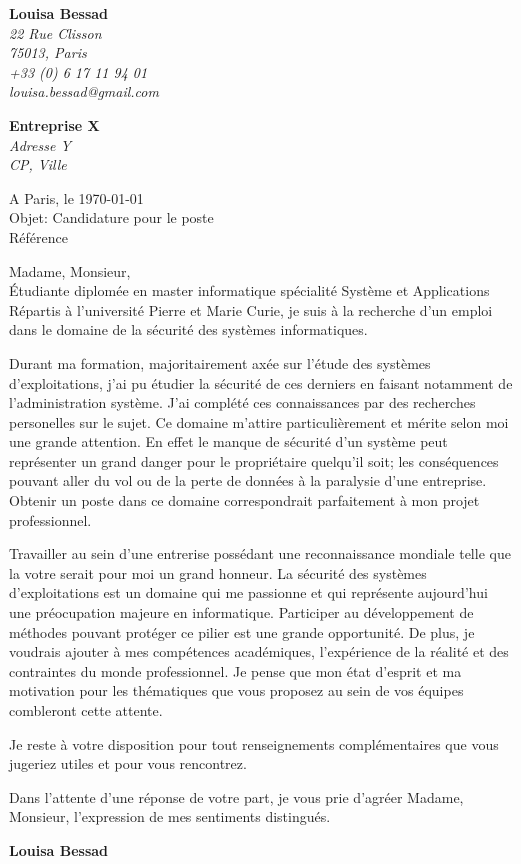 \documentclass[12pt]{letter}
\begin{document}
 \sffamily
 \begin{flushleft}
 {\bfseries Louisa Bessad}\\[.35ex]
 \small\itshape
 22 Rue Clisson\\
 75013, Paris\\[.35ex]
 +33 (0) 6 17 11 94 01\\
 louisa.bessad@gmail.com
 \end{flushleft}
 \begin{flushright}
 {\bfseries Entreprise X}\\[.35ex]
 \small\itshape
 Adresse Y\\
 CP, Ville
 \end{flushright}
 \begin{flushright}
 A Paris, le \today \\
 Objet: Candidature pour le poste \\
 Référence
 \end{flushright}
 Madame, Monsieur,\\


Étudiante diplomée en master informatique spécialité Système et Applications Répartis à l'université Pierre et Marie Curie, je suis à la recherche d'un emploi dans le domaine de la sécurité des systèmes informatiques.

Durant ma formation, majoritairement axée sur l'étude des systèmes d'exploitations, j'ai pu étudier la sécurité de ces derniers en faisant notamment de l'administration système. J'ai complété ces connaissances par des recherches personelles sur le sujet. Ce domaine m'attire particulièrement et mérite selon moi une grande attention. En effet le manque de sécurité d'un système peut représenter un grand danger pour le propriétaire quelqu'il soit; les conséquences pouvant aller du vol ou de la perte de données à la paralysie d'une entreprise. Obtenir un poste dans ce domaine correspondrait parfaitement à mon projet professionnel.

Travailler au sein d'une entrerise possédant une reconnaissance mondiale telle que la votre serait pour moi un grand honneur. La sécurité des systèmes d'exploitations est un domaine qui me passionne et qui représente aujourd'hui une préocupation majeure en informatique. Participer au développement de méthodes pouvant protéger ce pilier est une grande opportunité. De plus, je voudrais ajouter à mes compétences académiques, l'expérience de la réalité et des contraintes du monde professionnel. Je pense que mon état d'esprit et ma motivation pour les thématiques que vous proposez au sein de vos équipes combleront cette attente.

Je reste à votre disposition pour tout renseignements complémentaires que vous jugeriez utiles et pour vous rencontrez.

Dans l'attente d'une réponse de votre part, je vous prie d'agréer Madame, Monsieur, l'expression de mes sentiments distingués.

 \begin{flushright}
 {\bfseries Louisa Bessad}
 \end{flushright}
 
\end{document}
